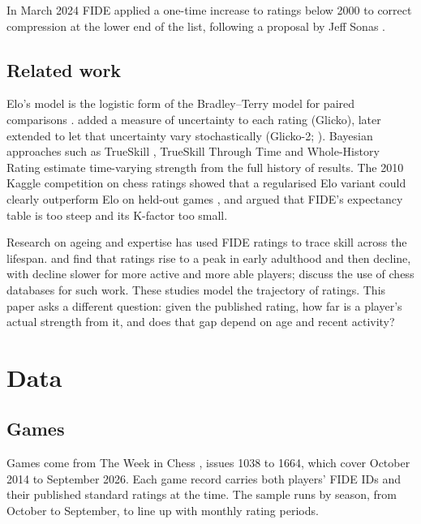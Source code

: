 \documentclass[11pt]{article}
\begin{document}
In March 2024 FIDE applied a one-time increase to ratings below 2000 to correct compression at the lower end of the list, following a proposal by Jeff Sonas \citep{sonasfide,sonas2024}.

\subsection{Related work}

Elo's model is the logistic form of the Bradley--Terry model for paired comparisons \citep{bradley1952}. \citet{glickman1999} added a measure of uncertainty to each rating (Glicko), later extended to let that uncertainty vary stochastically (Glicko-2; \citealp{glickman2001}). Bayesian approaches such as TrueSkill \citep{herbrich2007}, TrueSkill Through Time \citep{dangauthier2008} and Whole-History Rating \citep{coulom2008} estimate time-varying strength from the full history of results. The 2010 Kaggle competition on chess ratings \citep{kaggle2010} showed that a regularised Elo variant could clearly outperform Elo on held-out games \citep{sismanis2010}, and \citet{sonas2002} argued that FIDE's expectancy table is too steep and its K-factor too small.

Research on ageing and expertise has used FIDE ratings to trace skill across the lifespan. \citet{roring2007} and \citet{vaci2015} find that ratings rise to a peak in early adulthood and then decline, with decline slower for more active and more able players; \citet{vaci2017} discuss the use of chess databases for such work. These studies model the trajectory of ratings. This paper asks a different question: given the published rating, how far is a player's actual strength from it, and does that gap depend on age and recent activity?

\section{Data}

\subsection{Games}

Games come from The Week in Chess \citep{twic}, issues 1038 to 1664, which cover October 2014 to September 2026. Each game record carries both players' FIDE IDs and their published standard ratings at the time. The sample runs by season, from October to September, to line up with monthly rating periods.
\end{document}
